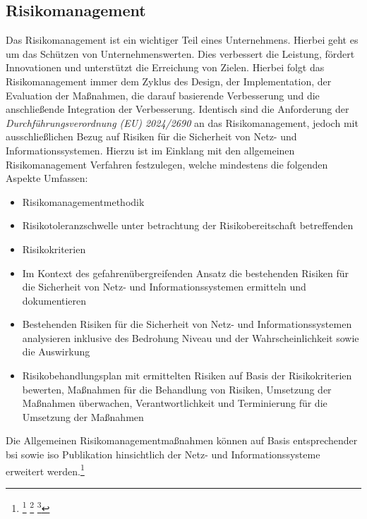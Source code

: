 \documentclass[11pt,a4paper,hidelinks]{article}   %
\begin{document}
        \subsection{Risikomanagement}
        Das Risikomanagement ist ein wichtiger Teil eines Unternehmens. Hierbei geht es um das Schützen von Unternehmenswerten. Dies verbessert die Leistung, fördert Innovationen und unterstützt die Erreichung von Zielen. Hierbei folgt das Risikomanagement immer dem Zyklus des Design, der Implementation, der Evaluation der Maßnahmen, die darauf basierende Verbesserung und die anschließende Integration der Verbesserung. Identisch sind die Anforderung der \emph{Durchführungsverordnung (EU) 2024/2690} an das Risikomanagement, jedoch mit ausschließlichen Bezug auf Risiken für die Sicherheit von Netz- und Informationssystemen. Hierzu ist im Einklang mit den allgemeinen Risikomanagement Verfahren festzulegen, welche mindestens die folgenden Aspekte Umfassen:
        \begin{itemize}
            \item Risikomanagementmethodik
            \item Risikotoleranzschwelle unter betrachtung der Risikobereitschaft betreffenden 
            \item Risikokriterien
            \item Im Kontext des gefahrenübergreifenden Ansatz die bestehenden Risiken für die Sicherheit von Netz- und Informationssystemen ermitteln und dokumentieren
            \item Bestehenden Risiken für die Sicherheit von Netz- und Informationssystemen analysieren inklusive des Bedrohung Niveau und der Wahrscheinlichkeit sowie die Auswirkung 
            \item Risikobehandlungsplan mit ermittelten Risiken auf Basis der Risikokriterien bewerten, Maßnahmen für die Behandlung von Risiken, Umsetzung der Maßnahmen überwachen, Verantwortlichkeit und Terminierung für die Umsetzung der Maßnahmen 
        \end{itemize}
        Die Allgemeinen Risikomanagementmaßnahmen können auf Basis entsprechender \gls{bsi} sowie \gls{iso} Publikation hinsichtlich der Netz- und Informationssysteme erweitert werden.\footnote{
            \footcite[Vgl. S. V, 2 - 4][]{iso31000-2018}
            \footcite[Vgl. S. 7, 9 - 10][]{bsi-200-3}
            \footcite[Vgl. §12][]{KRITIS-DachG}
        }
        
\end{document}
